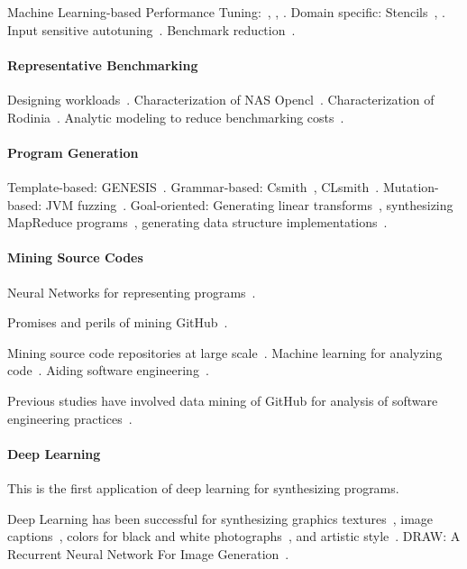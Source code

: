 \documentclass[preprint,nonatbib,10pt,nocopyrightspace]{sigplanconf}
\begin{document}
Machine Learning-based Performance Tuning:~\cite{Wen2015},
\cite{Magni2014}, \cite{Falch2015}. Domain specific:
Stencils~\cite{Garvey2015b}, \cite{Cummins2015a}. Input sensitive
autotuning~\cite{Ding2015}. Benchmark reduction~\cite{Castro2014}.


\paragraph{Representative Benchmarking} Designing
workloads~\cite{Eeckhout2002}. Characterization of NAS
Opencl~\cite{Seo2011}. Characterization of
Rodinia~\cite{Che2010,Ryoo2015}. Analytic modeling to reduce
benchmarking costs~\cite{Kalibera2013}.


\paragraph{Program Generation} Template-based:
GENESIS~\cite{Chiu2015}.  Grammar-based: Csmith~\cite{Yang2012},
CLsmith~\cite{Pflanzer2016}. Mutation-based: JVM
fuzzing~\cite{Chena}. Goal-oriented: Generating linear
transforms~\cite{Voronenko2009}, synthesizing MapReduce
programs~\cite{Smith}, generating data structure
implementations~\cite{Loncaric2016}.


\paragraph{Mining Source Codes} Neural Networks for representing
programs~\cite{Bunel}.

Promises and perils of mining GitHub~\cite{Bird2009}.

Mining source code repositories at large
scale~\cite{Allamanis2013a,White2015a}. Machine learning for analyzing
code~\cite{Allamanis2014a,Raychev}. Aiding software
engineering~\cite{Allamanis2014,Bird2015}.

Previous studies have involved data mining of GitHub for analysis of
software engineering
practices~\cite{Wu2014,Guzman2014,Baishakhi2014a,Vasilescu2015}.


\paragraph{Deep Learning} This is the first application of deep
learning for synthesizing programs.

Deep Learning has been successful for synthesizing graphics
textures~\cite{Gatys2015a}, image captions~\cite{Vinyals}, colors for
black and white photographs~\cite{Zhang2016}, and artistic
style~\cite{Gatys2015}. DRAW: A Recurrent Neural Network For Image
Generation~\cite{Gregor2014}.
\end{document}
